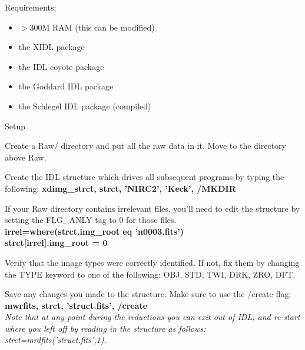 \documentclass[11pt,letterpaper,dvips]{article}
\begin{document}
\pagestyle{empty}
 


\begin{enumerate}

{\Large  \item Requirements:  }
	\begin{itemize}
		\item $>$300M RAM (this can be modified)
                \item the XIDL package
		\item the IDL coyote package 
		\item the Goddard IDL package
		\item the Schlegel IDL package (compiled)
	\end{itemize}

{\Large  \item Setup }

  \begin{Aenumerate}

  \item Create a Raw/ directory and put all the raw data in it.  Move
    to the directory above Raw.

  \item Create the IDL structure which drives all subsequent programs by typing the following:
    {\bf xdimg\_strct, strct, 'NIRC2', 'Keck', /MKDIR}\\

  \item If your Raw directory contains irrelevant files, you'll need to edit the structure by setting the FLG\_ANLY tag to 0 for those files.\\
    {\bf irrel=where(strct.img\_root eq 'n0003.fits')}\\
    {\bf strct[irrel].img\_root = 0} \\
    
  \item Verify that the image types were correctly identified.  If not, fix them by changing the TYPE keyword to one of the following: OBJ, STD, TWI, DRK, ZRO, DFT.

  \item Save any changes you made to the structure.  Make sure to use the /create flag:\\
    {\bf mwrfits, strct, 'struct.fits', /create}\\
    
    \it{Note that at any point during the reductions you can exit out of
      IDL, and re-start where you left off by reading in the structure
      as follows: strct=mrdfits('struct.fits',1).}
         

\end{Aenumerate}
\end{enumerate}
\end{document}
